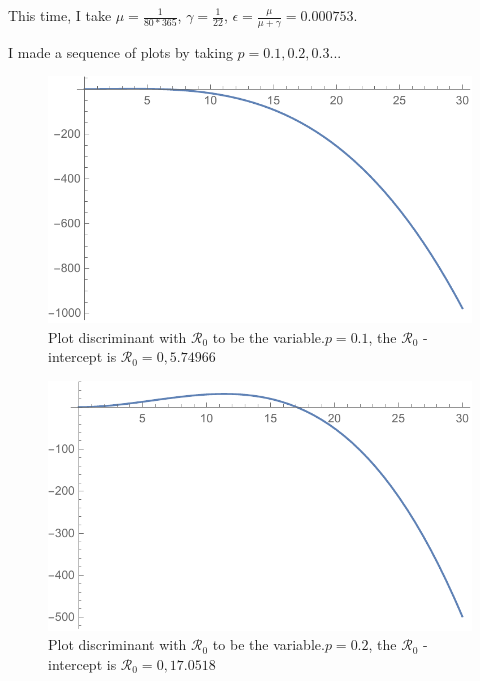 \documentclass[12pt]{article}
\begin{document}
This time, I take $\mu=\frac{1}{80*365}$, $\gamma=\frac{1}{22}$, $\epsilon=\frac{\mu}{\mu+\gamma}=0.000753$.

I made a sequence of plots by taking $p=0.1,0.2,0.3...$

\begin{figure}[H]
  \caption{Plot discriminant with $\mathcal{R}_0$ to be the variable.$p=0.1$, the $\mathcal{R}_0$ -intercept is $\mathcal{R}_0 = 0, 5.74966$}
  \centering
  \includegraphics[width=1.1\textwidth]{Figures/Plot_R_0_p_0_1.pdf}
\end{figure}

\begin{figure}[H]
  \caption{Plot discriminant with $\mathcal{R}_0$ to be the variable.$p=0.2$, the $\mathcal{R}_0$ -intercept is $\mathcal{R}_0 = 0, 17.0518$}
  \centering
  \includegraphics[width=1.1\textwidth]{Figures/Plot_R_0_p_0_2.pdf}
\end{figure}
\end{document}
